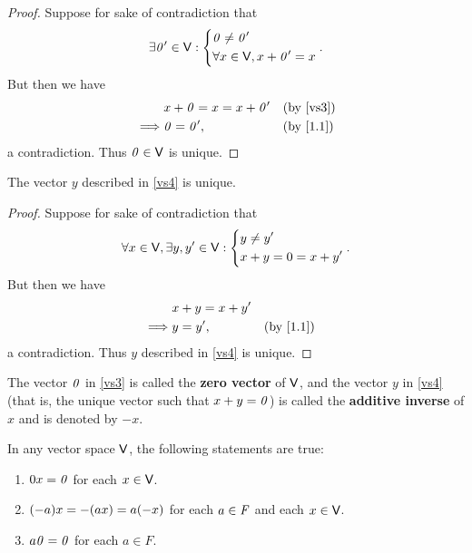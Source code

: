\begin{proof}
	Suppose for sake of contradiction that
	\[
		\exists \mathit{0}' \in \mathsf{V} : \begin{dcases}
			\mathit{0} \neq \mathit{0}' \\
			\forall x \in \mathsf{V}, x + \mathit{0}' = x
		\end{dcases}.
	\]
	But then we have
	\begin{align*}
		         & x + \zv = x = x + \zv' &  & \text{(by \ref{vs3})}  \\
		\implies & \zv = \zv',            &  & \text{(by \cref{1.1})}
	\end{align*}
	a contradiction.
	Thus \(\mathit{0} \in \mathsf{V}\) is unique.
\end{proof}

\begin{cor}\label{1.2.15}
	The vector \(y\) described in \ref{vs4} is unique.
\end{cor}

\begin{proof}
	Suppose for sake of contradiction that
	\[
		\forall x \in \mathsf{V}, \exists y, y' \in \mathsf{V} : \begin{dcases}
			y \neq y' \\
			x + y = 0 = x + y'
		\end{dcases}.
	\]
	But then we have
	\begin{align*}
		         & x + y = x + y'                             \\
		\implies & y = y',        &  & \text{(by \cref{1.1})}
	\end{align*}
	a contradiction.
	Thus \(y\) described in \ref{vs4} is unique.
\end{proof}

\begin{defn}\label{1.2.16}
	The vector \(\mathit{0}\) in \ref{vs3} is called the \textbf{zero vector} of \(\mathsf{V}\), and the vector \(y\) in \ref{vs4} (that is, the unique vector such that \(x + y = \mathit{0}\)) is called the \textbf{additive inverse} of \(x\) and is denoted by \(-x\).
\end{defn}

\begin{thm}\label{1.2}
	In any vector space \(\mathsf{V}\), the following statements are true:
	\begin{enumerate}
		\item \(0x = \mathit{0}\) for each \(x \in \mathsf{V}\).
		\item \(\p{-a}x = -\p{ax} = a\p{-x}\) for each \(a \in \mathit{F}\) and each \(x \in \mathsf{V}\).
		\item \(a\mathit{0} = \mathit{0}\) for each \(a \in F\).
	\end{enumerate}
\end{thm}

